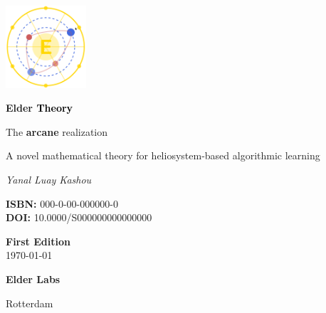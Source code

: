 \documentclass[11pt,twoside]{book}
\begin{document}
\frontmatter

\begin{titlepage}
    \centering
    \vspace*{0.5cm}
    \includegraphics[width=3cm]{../shared/figures/elder_symbol.pdf}
    \vspace{0.5cm}
    
    {\Huge\bfseries \textcolor{DarkSkyBlue}{Elder }\textrm{\textcolor{black}{Theory}}\par}
    \vspace{0.8cm}
    {\Large The \textcolor{DarkSkyBlue}{\textbf{arcane}} realization\par}
    \vspace{0.3cm}
    {\large A novel mathematical theory for heliosystem-based algorithmic learning\par}
    
    \vspace{3cm}
    {\Large\itshape Yanal Luay Kashou\par}

    \vfill
    
    \begin{minipage}{0.4\textwidth}
        \begin{flushleft}
            \textbf{ISBN:} 000-0-00-000000-0 \\
            \textbf{DOI:} 10.0000/S000000000000000
        \end{flushleft}
    \end{minipage}%
    \begin{minipage}{0.4\textwidth}
        \begin{flushright}
            \textbf{First Edition} \\
            \today
        \end{flushright}
    \end{minipage}
    
    \vspace{1cm}
    {\large \textbf{Elder Labs}\par}
    {\small Rotterdam\par}
\end{titlepage}
\end{document}
